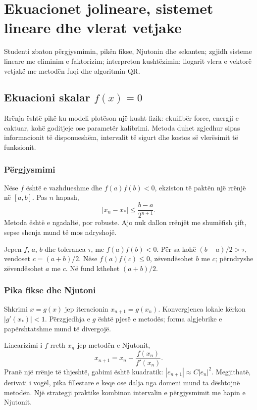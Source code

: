\chapter{Ekuacionet jolineare, sistemet lineare dhe vlerat vetjake}
\begin{qellime}
Studenti zbaton përgjysmimin, pikën fikse, Njutonin dhe sekanten; zgjidh sisteme lineare me eliminim e faktorizim; interpreton kushtëzimin; llogarit vlera e vektorë vetjakë me metodën fuqi dhe algoritmin QR.
\end{qellime}

\section{Ekuacioni skalar $f(x)=0$}
Rrënja është pikë ku modeli plotëson një kusht fizik: ekuilibër force, energji e caktuar, kohë goditjeje ose parametër kalibrimi. Metoda duhet zgjedhur sipas informacionit të disponueshëm, intervalit të sigurt dhe kostos së vlerësimit të funksionit.

\subsection{Përgjysmimi}
Nëse $f$ është e vazhdueshme dhe $f(a)f(b)<0$, ekziston të paktën një rrënjë në $[a,b]$. Pas $n$ hapash,
\begin{equation}
 |x_n-x_*|\le \frac{b-a}{2^{n+1}}.
\end{equation}
Metoda është e ngadaltë, por robuste. Ajo nuk dallon rrënjët me shumëfish çift, sepse shenja mund të mos ndryshojë.

\begin{shembull}
Jepen $f$, $a$, $b$ dhe toleranca $\tau$, me $f(a)f(b)<0$. Për sa kohë $(b-a)/2>\tau$, vendoset $c=(a+b)/2$. Nëse $f(a)f(c)\le0$, zëvendësohet $b$ me $c$; përndryshe zëvendësohet $a$ me $c$. Në fund kthehet $(a+b)/2$.
\end{shembull}

\subsection{Pika fikse dhe Njutoni}
Shkrimi $x=g(x)$ jep iteracionin $x_{n+1}=g(x_n)$. Konvergjenca lokale kërkon $|g'(x_*)|<1$. Përzgjedhja e $g$ është pjesë e metodës; forma algjebrike e papërshtatshme mund të divergojë.

Linearizimi i $f$ rreth $x_n$ jep metodën e Njutonit,
\begin{equation}
 x_{n+1}=x_n-\frac{f(x_n)}{f'(x_n)}.
\end{equation}
Pranë një rrënje të thjeshtë, gabimi është kuadratik: $|e_{n+1}|\approx C|e_n|^2$. Megjithatë, derivati i vogël, pika fillestare e keqe ose dalja nga domeni mund ta dështojnë metodën. Një strategji praktike kombinon intervalin e përgjysmimit me hapin e Njutonit.

